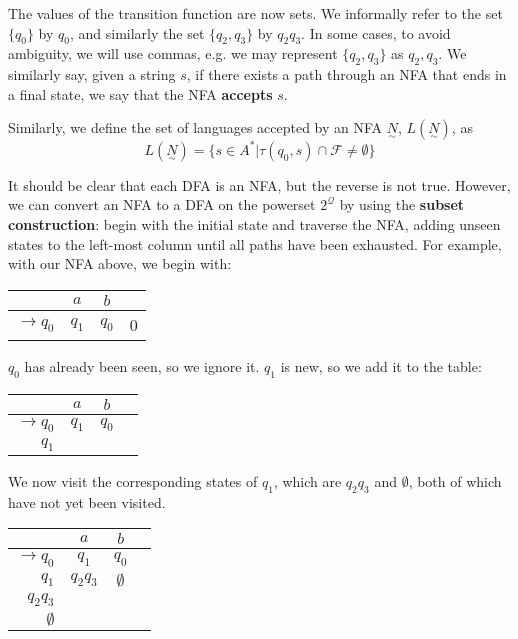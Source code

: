 The values of the transition function are now sets. We informally refer to the set \(\{q_0\}\) by \(q_0\), and similarly the set \(\{q_2, q_3\}\) by \(q_2q_3\). In some cases, to avoid ambiguity, we will use commas, e.g. we may represent \(\{q_2, q_3\}\) as \(q_2,q_3\). We similarly say, given a string \(s\), if there exists a path through an NFA that ends in a final state, we say that the NFA \textbf{accepts} \(s\).

Similarly, we define the set of languages accepted by an NFA \(\underset{\sim}{N}\), \(L(\underset{\sim}{N})\), as \[L(\underset{\sim}{N}) = \{s\in A^*|\tau(q_0, s)\cap\mathcal{F}\neq\emptyset\}\]

It should be clear that each DFA is an NFA, but the reverse is not true. However, we can convert an NFA to a DFA on the powerset \(2^{\mathcal{Q}}\) by using the \textbf{subset construction}: begin with the initial state and traverse the NFA, adding unseen states to the left-most column until all paths have been exhausted. For example, with our NFA above, we begin with:

\begin{center}\begin{tabular}{r|c c r}
         & \(a\) & \(b\) & \\\bottomrule
    \(\to q_0\) & \(q_1\) & \(q_0\) & 0 \\
\end{tabular}\end{center}

\(q_0\) has already been seen, so we ignore it. \(q_1\) is new, so we add it to the table:

\begin{center}\begin{tabular}{r|c c r}
         & \(a\) & \(b\) & \\\bottomrule
    \(\to q_0\) & \(q_1\) & \(q_0\) &  \\
          \(q_1\) &       &       & 
\end{tabular}\end{center}

We now visit the corresponding states of \(q_1\), which are \(q_2q_3\) and \(\emptyset\), both of which have not yet been visited. 

\begin{center}\begin{tabular}{r|c c r}
         & \(a\) & \(b\) & \\\bottomrule
    \(\to q_0\) & \(q_1\) & \(q_0\) &  \\
          \(q_1\) & \(q_2q_3\) & \(\emptyset\) & \\
          \(q_2q_3\) & & & \\
          \(\emptyset\) & & &
\end{tabular}\end{center}

